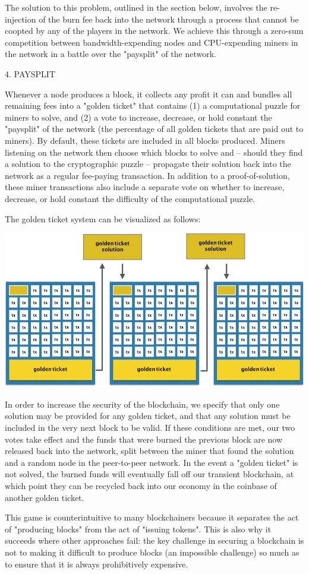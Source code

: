\documentclass[11.5pt, oneside]{article}   	%
\begin{document}
\begin{multicols}{2}
The solution to this problem, outlined in the section below, involves the re-injection of the burn fee back into the network through a process that cannot be coopted by any of the players in the network. We achieve this through a zero-sum competition between bandwidth-expending nodes and CPU-expending miners in the network in a battle over the "paysplit" of the network.

4. PAYSPLIT

Whenever a node produces a block, it collects any profit it can and bundles all remaining fees into a "golden ticket" that contains (1) a computational puzzle for miners to solve, and (2) a vote to increase, decrease, or hold constant the "paysplit" of the network (the percentage of all golden tickets that are paid out to miners). By default, these tickets are included in all blocks produced. Miners listening on the network then choose which blocks to solve and -- should they find a solution to the cryptographic puzzle -- propagate their solution back into the network as a regular fee-paying transaction. In addition to a proof-of-solution, these miner transactions also include a separate vote on whether to increase, decrease, or hold constant the difficulty of the computational puzzle.

The golden ticket system can be visualized as follows:

\includegraphics[width=.45\textwidth]{saito7.jpeg}

In order to increase the security of the blockchain, we specify that only one solution may be provided for any golden ticket, and that any solution must be included in the very next block to be valid. If these conditions are met, our two votes take effect and the funds that were burned the previous block are now released back into the network, split between the miner that found the solution and a random node in the peer-to-peer network. In the event a "golden ticket" is not solved, the burned funds will eventually fall off our transient blockchain, at which point they can be recycled back into our economy in the coinbase of another golden ticket.

This game is counterintuitive to many blockchainers because it separates the act of "producing blocks" from the act of "issuing tokens". This is also why it succeeds where other approaches fail: the key challenge in securing a blockchain is not to making it difficult to produce blocks (an impossible challenge) so much as to ensure that it is always prohibitively expensive.


\end{multicols}
\end{document}

